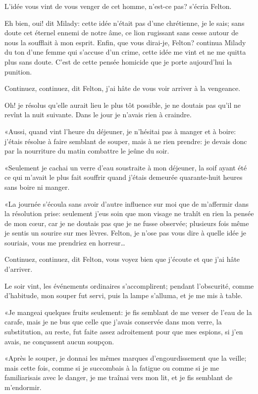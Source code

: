 \speak  L'idée vous vint de vous venger de cet homme, n'est-ce pas? s'écria Felton. 

\speak  Eh bien, oui! dit Milady: cette idée n'était pas d'une chrétienne, je le sais; sans doute cet éternel ennemi de notre âme, ce lion rugissant sans cesse autour de nous la soufflait à mon esprit. Enfin, que vous dirai-je, Felton? continua Milady du ton d'une femme qui s'accuse d'un crime, cette idée me vint et ne me quitta plus sans doute. C'est de cette pensée homicide que je porte aujourd'hui la punition. 

\speak  Continuez, continuez, dit Felton, j'ai hâte de vous voir arriver à la vengeance. 

\speak  Oh! je résolus qu'elle aurait lieu le plus tôt possible, je ne doutais pas qu'il ne revînt la nuit suivante. Dans le jour je n'avais rien à craindre. 

«Aussi, quand vint l'heure du déjeuner, je n'hésitai pas à manger et à boire: j'étais résolue à faire semblant de souper, mais à ne rien prendre: je devais donc par la nourriture du matin combattre le jeûne du soir. 

«Seulement je cachai un verre d'eau soustraite à mon déjeuner, la soif ayant été ce qui m'avait le plus fait souffrir quand j'étais demeurée quarante-huit heures sans boire ni manger. 

«La journée s'écoula sans avoir d'autre influence sur moi que de m'affermir dans la résolution prise: seulement j'eus soin que mon visage ne trahît en rien la pensée de mon cœur, car je ne doutais pas que je ne fusse observée; plusieurs fois même je sentis un sourire sur mes lèvres. Felton, je n'ose pas vous dire à quelle idée je souriais, vous me prendriez en horreur\dots 

\speak  Continuez, continuez, dit Felton, vous voyez bien que j'écoute et que j'ai hâte d'arriver. 

\speak  Le soir vint, les événements ordinaires s'accomplirent; pendant l'obscurité, comme d'habitude, mon souper fut servi, puis la lampe s'alluma, et je me mis à table. 

«Je mangeai quelques fruits seulement: je fis semblant de me verser de l'eau de la carafe, mais je ne bus que celle que j'avais conservée dans mon verre, la substitution, au reste, fut faite assez adroitement pour que mes espions, si j'en avais, ne conçussent aucun soupçon. 

«Après le souper, je donnai les mêmes marques d'engourdissement que la veille; mais cette fois, comme si je succombais à la fatigue ou comme si je me familiarisais avec le danger, je me traînai vers mon lit, et je fis semblant de m'endormir. 

